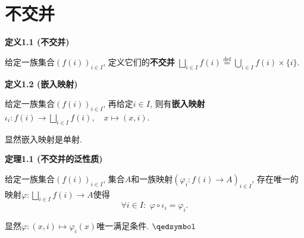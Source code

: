 


\setlength{\abovedisplayskip}{1pt}
\setlength{\belowdisplayskip}{1pt}

\section{不交并}

\hypertarget{sec:定义1.1}{}
\noindent\textbf{定义1.1 (不交并)}

给定一族集合$(f(i))_{i\in I}$, 定义它们的\textbf{不交并}
$\displaystyle
\bigsqcup_{i\in I}f(i)\overset{\mathrm{def}}{=}\bigcup_{i\in I}f(i)\times\{i\}$.

\vspace{10pt}

\hypertarget{sec:定义1.2}{}
\noindent\textbf{定义1.2 (嵌入映射)}

给定一族集合$(f(i))_{i\in I}$, 再给定$i\in I$, 则有\textbf{嵌入映射}
$\displaystyle\iota_i:f(i)\to\bigsqcup_{i\in I}f(i),\quad x\mapsto(x,i)$.

显然嵌入映射是单射.

\vspace{10pt}

\hypertarget{sec:定理1.1}{}
\noindent\textbf{定理1.1 (不交并的泛性质)}

给定一族集合$(f(i))_{i\in I}$, 集合$A$和一族映射$(\varphi_i:f(i)\to A)_{i\in I}$,
存在唯一的映射$\displaystyle\varphi:\bigsqcup_{i\in I}f(i)\to A$使得
\[
    \forall i\in I:\,\,\varphi\circ\iota_i=\varphi_i.
\]


显然$\varphi:(x,i)\mapsto\varphi_i(x)$唯一满足条件. \hfill $\qedsymbol$

\vspace{10pt}





